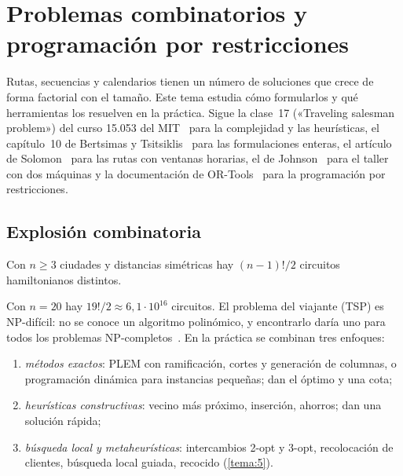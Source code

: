 \chapter{Problemas combinatorios y programación por restricciones}
\label{tema:3}

Rutas, secuencias y calendarios tienen un número de soluciones que crece de forma factorial con el tamaño. Este tema estudia cómo formularlos y qué herramientas los resuelven en la práctica. Sigue la clase~17 («Traveling salesman problem») del curso 15.053 del MIT~\cite{mit15053} para la complejidad y las heurísticas, el capítulo~10 de Bertsimas y Tsitsiklis~\cite{bt} para las formulaciones enteras, el artículo de Solomon~\cite{solomon} para las rutas con ventanas horarias, el de Johnson~\cite{johnson} para el taller con dos máquinas y la documentación de OR-Tools~\cite{ortools-vrptw,ortools-js,ortools-cpsat} para la programación por restricciones.

\section{Explosión combinatoria}

\begin{proposicion}\label{prop:circuitos}
Con $n\ge 3$ ciudades y distancias simétricas hay $(n-1)!/2$ circuitos hamiltonianos distintos.
\end{proposicion}

Con $n=20$ hay $19!/2\approx 6{,}1\cdot 10^{16}$ circuitos. El problema del viajante (TSP) es NP-difícil: no se conoce un algoritmo polinómico, y encontrarlo daría uno para todos los problemas NP-completos~\cite{mit15053}. En la práctica se combinan tres enfoques:
\begin{enumerate}[label=(\alph*)]
  \item \emph{métodos exactos}: PLEM con ramificación, cortes y generación de columnas, o programación dinámica para instancias pequeñas; dan el óptimo y una cota;
  \item \emph{heurísticas constructivas}: vecino más próximo, inserción, ahorros; dan una solución rápida;
  \item \emph{búsqueda local y metaheurísticas}: intercambios 2-opt y 3-opt, recolocación de clientes, búsqueda local guiada, recocido (\cref{tema:5}).
\end{enumerate}


